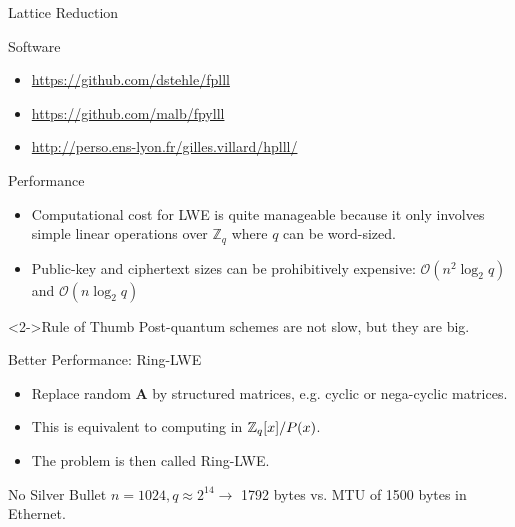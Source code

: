 \documentclass[presentation,smaller]{beamer}
\newcommand{\ZZ}[1][blank]{\ensuremath{\ifthenelse{\equal{#1}{blank}}{\mathbb{Z}}{\mathbb{Z}\left[#1\right]}\xspace}}
\renewcommand{\vec}[1]{\ensuremath{\mathbf{#1}}\xspace}
\begin{document}
\begin{frame}[label={sec:orgheadline22}]{Lattice Reduction}
\begin{block}{Software}
\begin{itemize}
\item \url{https://github.com/dstehle/fplll}
\item \url{https://github.com/malb/fpylll}
\item \url{http://perso.ens-lyon.fr/gilles.villard/hplll/}
\end{itemize}
\end{block}
\end{frame}


\begin{frame}[label={sec:orgheadline23}]{Performance}
\begin{itemize}
\item \alert{Computational} cost for LWE is quite manageable because it only involves simple linear operations over \(\mathbb{Z}_q\) where \(q\) can be word-sized.
\item Public-key and ciphertext \alert{sizes} can be prohibitively expensive: \(\mathcal{O}(n^2 \log_2 q)\) and \(\mathcal{O}(n \log_2 q)\)
\end{itemize}

\begin{block}<2->{Rule of Thumb}
Post-quantum schemes are not slow, but they are big.
\end{block}
\end{frame}

\begin{frame}[label={sec:orgheadline24}]{Better Performance: Ring-LWE}
\begin{itemize}
\item Replace random \(\vec{A}\) by structured matrices, e.g. cyclic or nega-cyclic matrices.
\item This is equivalent to computing in \(\ZZ_q[x]/P(x)\).
\item The problem is then called \alert{Ring-LWE}.
\end{itemize}

\pause

\begin{block}{No Silver Bullet}
\(n=1024, q≈ 2^{14} →\) 1792 bytes vs. MTU of 1500 bytes in Ethernet.
\end{block}
\end{frame}
\end{document}
